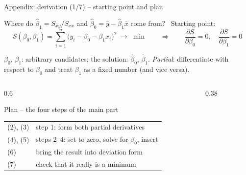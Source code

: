 \documentclass[aspectratio=169,11pt]{beamer}
\begin{document}
\begin{frame}[label=derivation]{Appendix: derivation (1/7) -- starting point and plan}
  \begin{block}{Where do $\hat{\beta}_1 = S_{xy}/S_{xx}$ and $\hat{\beta}_0 = \bar{y} - \hat{\beta}_1\bar{x}$ come from? \ Starting point:}
    \[
      S(\beta_0,\beta_1) = \sum_{i=1}^{n}\bigl(y_i - \beta_0 - \beta_1 x_i\bigr)^{2} \;\to\; \min
      \qquad\Longrightarrow\qquad
      \frac{\partial S}{\partial \beta_0} = 0, \quad \frac{\partial S}{\partial \beta_1} = 0
    \]
    \vspace{-8pt}

    \footnotesize $\beta_0$, $\beta_1$: arbitrary candidates; the solution:
    $\hat{\beta}_0$, $\hat{\beta}_1$. \emph{Partial}: differentiate with respect
    to $\beta_0$ and treat $\beta_1$ as a fixed number (and vice versa).
  \end{block}

  \begin{columns}[T]
    \begin{column}{0.6\textwidth}
      \begin{exampleblock}{Plan -- the four steps of the main part}
        \footnotesize
        \begin{tabular}{@{}ll@{}}
          (2), (3) & step 1: form both partial derivatives \\
          (4), (5) & steps 2--4: set to zero, solve for $\beta_0$, insert \\
          (6)      & bring the result into deviation form \\
          (7)      & check that it really is a minimum
        \end{tabular}
      \end{exampleblock}
    \end{column}
    \begin{column}{0.38\textwidth}
      \begin{center}
      \end{center}
    \end{column}
  \end{columns}
  \hfill\hyperlink{solutionpath}{}
\end{frame}
\end{document}
